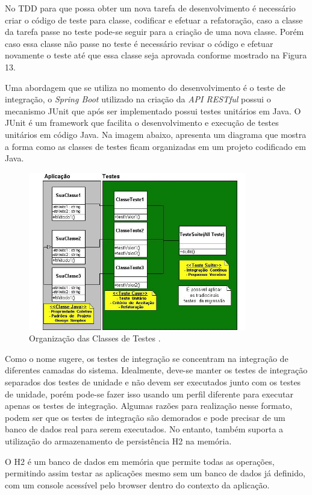     No TDD para que possa obter um nova tarefa de desenvolvimento é necessário criar o código de teste para classe, codificar e efetuar a refatoração, caso a classe da tarefa passe no teste pode-se seguir para a criação de uma nova classe. Porém caso essa classe não passe no teste é necessário revisar o código e efetuar novamente o teste até que essa classe seja aprovada conforme mostrado na Figura 13.
    
    Uma abordagem que se utiliza no momento do desenvolvimento é o teste de integração, o \textit{Spring Boot} utilizado na criação da \textit{API RESTful} possui o mecanismo JUnit que após ser implementado possui testes unitários em Java. O JUnit é um framework que facilita o desenvolvimento e execução de testes unitários em código Java. Na imagem abaixo, apresenta um diagrama que mostra a forma como as classes de testes ficam organizadas em um projeto codificado em Java. 

    \begin{figure}[h]
    \centering
    \includegraphics[width=0.85\textwidth]{./img/ClassesTeste.jpg}
    \caption{Organização das Classes de Testes .}
    \label{fig:ClassesTeste}
    \end{figure}

    Como o nome sugere, os testes de integração se concentram na integração de diferentes camadas do sistema. Idealmente, deve-se manter os testes de integração separados dos testes de unidade e não devem ser executados junto com os testes de unidade, porém pode-se fazer isso usando um perfil diferente para executar apenas os testes de integração. Algumas razões para realização nesse formato, podem ser que os testes de integração são demorados e pode precisar de um banco de dados real para serem executados. No entanto, também suporta a utilização do armazenamento de persistência H2 na memória.

    O H2 é um banco de dados em memória que permite todas as operações, permitindo assim testar as aplicações mesmo sem um banco de dados já definido, com um console acessível pelo browser dentro do contexto da aplicação.



 
